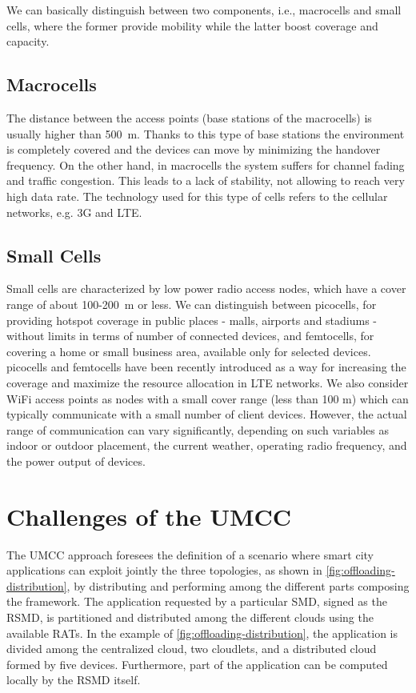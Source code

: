 \documentclass[twoside,openright]{report}
\begin{document}
We can basically distinguish between two components, i.e., macrocells and small cells, where the former provide mobility while the latter boost coverage and capacity.

\subsection*{Macrocells}
The distance between the access points (base stations of the macrocells) is usually higher than 500~m. Thanks to this type of base stations the environment is completely covered and the devices can move by minimizing the handover frequency. On the other hand, in macrocells the system suffers for channel fading and traffic congestion. This leads to a lack of stability, not allowing to reach very high data rate. The technology used for this type of cells refers to the cellular networks, e.g. \gls{3G} and \gls{LTE}.
\subsection*{Small Cells} 
Small cells are characterized by low power radio access nodes, which have a cover range of about 100-200~m or less. We can distinguish between \glspl{picocell}, for providing hotspot coverage in public places - malls, airports and stadiums - without limits in terms of number of connected devices, and \glspl{femtocell}, for covering a home or small business area, available only for selected devices. \Glspl{picocell} and \glspl{femtocell} have been recently introduced as a way for increasing the coverage and maximize the resource allocation in \gls{LTE} networks. We also consider \gls{WiFi} access points as nodes with a small cover range (less than 100 m) which can typically communicate with a small number of client devices. However, the actual range of communication can vary significantly, depending on such variables as indoor or outdoor placement, the current weather, operating radio frequency, and the power output of devices.

 
\section{Challenges of the UMCC}
\label{sec:challenges}
The \gls{UMCC} approach foresees the definition of a scenario where smart city applications can exploit jointly the three topologies, as shown in \autoref{fig:offloading-distribution}, by distributing and performing among the different parts composing the framework. 
The application requested by a particular \gls{SMD}, signed as the \gls{RSMD}, is partitioned and distributed among the different clouds using the available \glspl{RAT}. In the example of \autoref{fig:offloading-distribution},  the application is divided among the centralized cloud, two cloudlets, and a distributed cloud formed by five devices. Furthermore, part of the application can be computed locally by the \gls{RSMD} itself.
\end{document}
